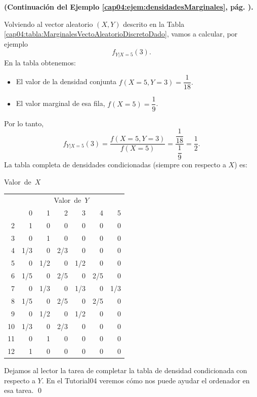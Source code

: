 \begin{ejemplo}
\label{cap04:ejem:densidadesCondicionadas}
{\bf (Continuación del Ejemplo \ref{cap04:ejem:densidadesMarginales}, pág. \pageref{cap04:ejem:densidadesMarginales}).}

Volviendo al vector aleatorio $(X,Y)$ descrito en la  Tabla \ref{cap04:tabla:MarginalesVectoAleatorioDiscretoDado}, vamos a calcular, por ejemplo
\[f_{Y|X=5}(3).\]
En la tabla obtenemos:
\begin{itemize}
  \item El valor de la densidad conjunta $f(X=5, Y=3)=\dfrac{1}{18}.$\\[2mm]
  \item El valor marginal de esa fila, $f(X=5)=\dfrac{1}{9}$.
\end{itemize}
Por lo tanto,
\[f_{Y|X=5}(3)=\dfrac{f(X=5, Y=3)}{f(X=5)}=\dfrac{\dfrac{1}{18}}{\dfrac{1}{9}}=\dfrac{1}{2}.\]
La tabla completa de densidades condicionadas (siempre con respecto a $X$) es:
\begin{center}
{\scriptsize
\hspace{-1cm}\mbox{Valor de $X$}\quad
\begin{tabular}{|r|r|r|r|r|r|r|}
 \multicolumn{1}{c}{} &\multicolumn{6}{c}{\mbox{Valor de $Y$}}{}\\
  \cline{2-7}
 \multicolumn{1}{c|}{}& 0 & 1 & 2 & 3 & 4 & 5 \\
  \hline
  2 & 1 & 0 & 0 & 0 & 0 & 0 \\ \hline
  3 & 0 & 1 & 0 & 0 & 0 & 0 \\ \hline
  4 & 1/3 & 0 & 2/3 & 0 & 0 & 0 \\ \hline
  5 & 0 & 1/2 & 0 & 1/2 & 0 & 0 \\ \hline
  6 & 1/5 & 0 & 2/5 & 0 & 2/5 & 0 \\ \hline
  7 & 0 & 1/3 & 0 & 1/3 & 0 & 1/3 \\ \hline
  8 & 1/5 & 0 & 2/5 & 0 & 2/5 & 0 \\ \hline
  9 & 0 & 1/2 & 0 & 1/2 & 0 & 0 \\ \hline
  10 & 1/3 & 0 & 2/3 & 0 & 0 & 0 \\ \hline
  11 & 0 & 1 & 0 & 0 & 0 & 0 \\ \hline
  12 & 1 & 0 & 0 & 0 & 0 & 0 \\ \hline
\end{tabular}
}
\end{center}
Dejamos al lector la tarea de completar la tabla de densidad condicionada con respecto a $Y$. En el Tutorial04 veremos cómo nos puede ayudar el ordenador en esa tarea.
\qed
\end{ejemplo}

